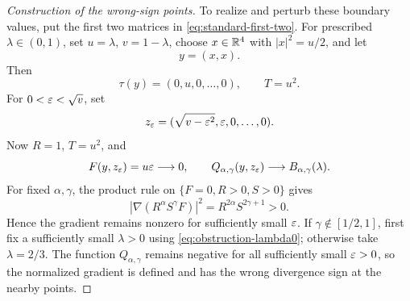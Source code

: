 \begin{proof}[Construction of the wrong-sign points]
To realize and perturb these boundary values, put the first two matrices in
\eqref{eq:standard-first-two}.  For prescribed
$\lambda\in(0,1)$, set $u=\lambda$, $v=1-\lambda$, choose
$x\in\mathbb R^4$ with $|x|^2=u/2$, and let
\begin{equation}\label{eq:actual-y}
 y=(x,x).
\end{equation}
Then
\[
 \tau(y)=(0,u,0,\ldots,0),\qquad T=u^2.
\]
For $0<\varepsilon<\sqrt v$, set
\[
 z_\varepsilon=(\sqrt{v-\varepsilon^2},\varepsilon,0,\ldots,0).
\]
Now \(R=1\), \(T=u^2\), and
\begin{equation}\label{eq:actual-omega}
 F(y,z_\varepsilon)=u\varepsilon\longrightarrow0,
 \qquad
 Q_{\alpha,\gamma}(y,z_\varepsilon)
   \longrightarrow B_{\alpha,\gamma}(\lambda).
\end{equation}
For fixed \(\alpha,\gamma\), the product rule on
\(\{F=0,R>0,S>0\}\) gives
\[
 |\nabla(R^\alpha S^\gamma F)|^2
 =R^{2\alpha}S^{2\gamma+1}>0.
\]
Hence the gradient remains nonzero for sufficiently small \(\varepsilon\).
If \(\gamma\notin[1/2,1]\), first fix a sufficiently small
\(\lambda>0\) using \eqref{eq:obstruction-lambda0}; otherwise take
\(\lambda=2/3\).  The function \(Q_{\alpha,\gamma}\) remains negative
for all sufficiently small \(\varepsilon>0\),
so the normalized gradient is defined and has the wrong divergence sign
at the nearby points.
\end{proof}
